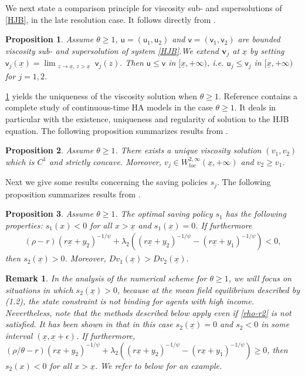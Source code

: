 \documentclass[11pt]{article}
\numberwithin{equation}{section}
\numberwithin{algorithm}{section}
\newtheorem{proposition}[proposition]{Proposition}
\newtheorem{remark}[remark]{Remark}
\newcommand{\lc}{\left(}
\newcommand{\rc}{\right)}
\newcommand{\ux}{{\underline x}}
\newcommand{\beq}{\begin{equation}}
\newcommand{\eeq}{\end{equation}}
\theoremstyle{plain}
\begin{document}
We next state a comparison principle for viscosity sub- and supersolutions of \eqref{HJB}, in the late resolution case. It follows directly from \cite[Proposition 3.3]{Achdou:2026aa}.
\begin{proposition}\label{comparison}
Assume $\theta \geq 1$, $\mathsf{u}=(\mathsf{u}_1,\mathsf{u}_2)$ and $\mathsf{v}=(\mathsf{v}_1,\mathsf{v}_2)$ are bounded viscosity sub- and supersolution of system \eqref{HJB}.We extend $\mathbf{v}_j$ at $\ux$ by setting 
$
\mathsf{v}_j(\ux)=\lim_{\substack{z\rightarrow \ux,\, z>\ux}} \mathsf{v}_j(z) .
$
Then $\mathsf{u}\leq \mathsf{v}$ in $[\ux,+\infty)$, i.e. $\mathsf{u}_j\le \mathsf{v}_j$ in $[\ux,+\infty)$ for $j=1,2$.
\end{proposition}
\cref{comparison} yields the uniqueness of the viscosity solution when $\theta \geq 1$. Reference \cite{Achdou:2026aa} contains a complete study of continuous-time HA models in the case $\theta\geq 1$. It deals in particular with the existence, uniqueness and regularity of solution to the HJB equation. The following proposition summarizes results from \cite[Proposition 3.7, Proposition 3.9, Proposition 3.10, Proposition 3.15, Proposition 3.16]{Achdou:2026aa} .

\begin{proposition}\label{Prop: v sol}
Assume $\theta \geq 1$. There exists a unique viscosity solution $(v_1,v_2)$ which is $C^1$ and strictly concave. Moreover, $v_j\in W^{2,\infty}_{loc}(\ux,+\infty)$ and $v_2\geq v_1$. 
\end{proposition}
Next we give some results concerning the saving policies $s_j$. The following proposition summarizes results from \cite[Proposition 3.17, Corollary 3.18, Proposition 3.21]{Achdou:2026aa}.
\begin{proposition}\label{Prop: saving}
Assume $\theta \geq 1$. The optimal saving policy $s_1$ has the following properties: $s_1(x)< 0$ for all $x> \ux$ and $s_1(\ux)=0$. If furthermore
\beq\label{rho-r2}
\begin{aligned}
\lc \rho-r\rc(r\ux+y_2)^{-1/\psi}+\lambda_2\lc (r\ux+y_2)^{-1/\psi}-(r\ux+y_1)^{-1/\psi}\rc< 0,
\end{aligned}
\eeq
then $s_2(\ux)>0$. Moreover, $Dv_1(\ux)>Dv_2(\ux)$. 
\end{proposition}

\begin{remark}
In the analysis of the numerical scheme for $\theta\geq 1$, we will focus on situations in which $s_2(\underline x)>0$,  because at the mean field  equilibrium described by (1.2),   the state constraint is not binding for agents with high income. Nevertheless, note that the methods described below apply even if \cref{rho-r2} is not satisfied. It has been shown in \cite{Achdou:2026aa} that in this case $s_2(\underline x)=0$ and $s_2<0$ in some interval $(\underline x, \underline x+ \epsilon)$. If furthermore,  $\lc \rho/\theta-r\rc(r\ux+y_2)^{-1/\psi}+\lambda_2\lc (r\ux+y_2)^{-1/\psi}-(r\ux+y_1)^{-1/\psi}\rc\geq 0$, then $s_2(x)<0$ for all $x>\ux$. We refer to  below for an example.
\end{remark}
\end{document}

